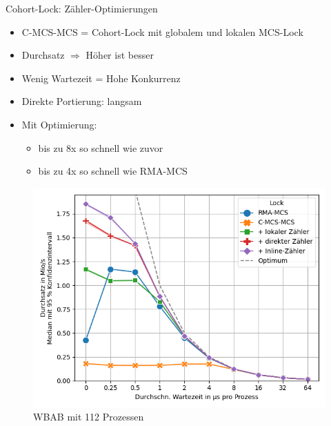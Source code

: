 \documentclass[fleqn,compress,utf8,aspectratio=169,t]{beamer}
\begin{document}
\begin{frame}{Cohort-Lock: Zähler-Optimierungen}
    \begin{minipage}{.52\textwidth}
        \begin{itemize}
            \setlength\itemsep{.5em}
            \item C-MCS-MCS = Cohort-Lock mit globalem und lokalen MCS-Lock
            \item Durchsatz $\Rightarrow$ Höher ist besser
            \item Wenig Wartezeit = Hohe Konkurrenz
            \item Direkte Portierung: langsam
            \item Mit Optimierung:
                  \vspace{.5em}
                  \begin{itemize}
                      \setlength\itemsep{.5em}
                      \item bis zu 8x so schnell wie zuvor
                      \item bis zu 4x so schnell wie RMA-MCS
                  \end{itemize}
        \end{itemize}
    \end{minipage}
    \begin{minipage}{.47\textwidth}
        \begin{figure}
            \includegraphics[width=\textwidth]{../../Dokumentation/Latex/Bilder/benchmarks/intelmpi/cohort-counter-optimization/WBAB-processes=112,mpi_progress=1-throughput}
            \caption{WBAB mit 112 Prozessen}
        \end{figure}
    \end{minipage}
\end{frame}
\end{document}

